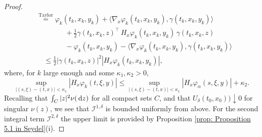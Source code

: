 \begin{proof}
\begin{align*}
        & \overset{\text{Taylor}}{=} \varphi_k(t_k,x_k,y_k) + \langle \nabla_x \varphi_k(t_k,x_k,y_k), \gamma(t_k,x_k,y_k) \rangle \\
        & \qquad \qquad+ \frac 1 2 \gamma(t_k,x_k,z)^\top \, H_x \varphi_k(t_k,x_k,y_k) \, \gamma(t_k,x_k,z) \\
        & \qquad \qquad  - \varphi_k(t_k,x_k,y_k) - \langle \nabla_x \varphi_k(t_k,x_k,y_k), \gamma(t_k,x_k,y_k) \rangle \\
        & \quad \leq \frac 1 2 |\gamma(t_k,x_k,z)|^2 |H_x \varphi_k(t_k,x_k,y_k)|,
    \end{align*}
    where, for $k$ large enough and some $\kappa_1, \kappa_2 > 0$, 
    \begin{equation*}
        \sup_{|(s,\xi)-(t,x)| < \kappa_1} |H_x \varphi_k(t,\xi,y)| \leq \sup_{|(s,\xi)-(t,x)| < \kappa_1} |H_x \varphi_\alpha (s,\xi,y)| + \kappa_2.
    \end{equation*}
    Recalling that $\int_C |z|^2 \nu(\,\mathrm{d} z)$ for all compact sets $C$, and that $U_\delta (t_0,x_0)) \downarrow 0$ for singular $\nu(z)$, we see that $\mathcal{I}^{1,\delta}$ is bounded uniformly from above. For the second integral term $\mathcal I^{2,\delta}$ the upper limit is provided by Proposition \ref{prop: Proposition 5.1 in Seydel}(i). 


\end{proof}
